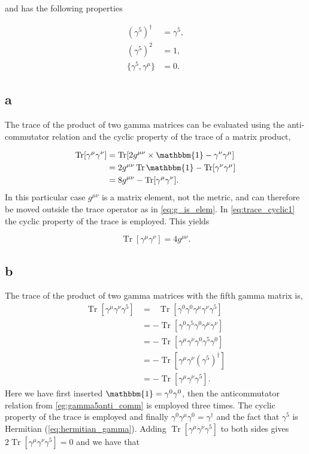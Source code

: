 \documentclass[11pt, a4paper]{amsart}
\DeclareMathOperator{\Tr}{Tr}
\begin{document}
and has the following properties

\begin{align}
(\gamma^5)^\dagger &= \gamma^5, \label{eq:hermitian_gamma}\\
(\gamma^5)^2 &= 1, \label{eq:gamma5sq} \\
\{\gamma^5, \gamma^\mu \} &= 0 \label{eg:gamma5anti_comm}.
\end{align}

\subsection*{a}

The trace of the product of two gamma matrices can be evaluated using the anti-commutator relation and the cyclic property of the trace of a matrix product,

\begin{align}
\Tr[\gamma^\mu \gamma^\nu] &= \Tr[2g^{\mu\nu} \times \mathbbm{1} - \gamma^\nu\gamma^\mu] \\
   &= 2g^{\mu\nu} \Tr \mathbbm{1} - \Tr[\gamma^\nu\gamma^\mu] \label{eq:g_is_elem} \\
   &= 8g^{\mu\nu} - \Tr[\gamma^\mu\gamma^\nu] \label{eq:trace_cyclic1}.
\end{align}
In this particular case $g^{\mu\nu}$ is a matrix element, not the metric, and can therefore be moved outside the trace operator as in \ref{eq:g_is_elem}. In \ref{eq:trace_cyclic1} the cyclic property of the trace is employed. This yields

\begin{equation}
\Tr[\gamma^\mu\gamma^\nu] = 4g^{\mu\nu}.
\end{equation}

\subsection*{b}

The trace of the product of two gamma matrices with the fifth gamma matrix is,
\begin{align}
\Tr[\gamma^\mu\gamma^\nu\gamma^5] 
  &= \ \ \ \Tr[\gamma^0\gamma^0\gamma^\mu\gamma^\nu\gamma^5] \\
  &= -\Tr[ \gamma^0\gamma^5\gamma^0 \gamma^\mu \gamma^\nu]  \\
  &= -\Tr[\gamma^\mu\gamma^\nu\gamma^0\gamma^5\gamma^0]  \\
  &= -\Tr[\gamma^\mu\gamma^\nu(\gamma^5)^\dagger] \\
  &= -\Tr[\gamma^\mu\gamma^\nu\gamma^5] .
\end{align}
Here we have first inserted $\mathbbm{1} = \gamma^0\gamma^0$, then the anticommutator relation from \autoref{eg:gamma5anti_comm} is employed three times. The cyclic property of the trace is employed and finally $\gamma^0\gamma^\mu\gamma^0 = \gamma^\dagger$ and the fact that $\gamma^5$ is Hermitian (\autoref{eq:hermitian_gamma}). Adding $\Tr[\gamma^\mu\gamma^\nu\gamma^5]$ to both sides gives $2\Tr[\gamma^\mu\gamma^\nu\gamma^5] = 0$ and we have that
\end{document}
